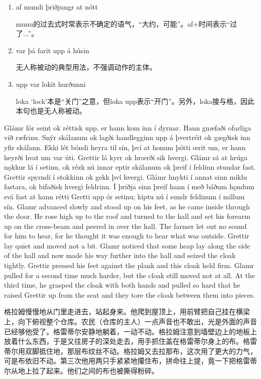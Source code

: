 \begin{grammar*}{}
    \begin{enumerate}[leftmargin=*]
        \item af mundi þriðjungr at nótt

              munu的过去式时常表示不确定的语气，“大约，可能”。af+时间表示“过了...”。

        \item var þá farit upp á húsin

              无人称被动的典型用法，不强调动作的主体。

        \item upp var lokit hurðunni

              loka `lock'本是“关门”之意，但loka upp表示“开门”。另外，loka接与格，因此本句也是无人称被动。
    \end{enumerate}
\end{grammar*}
\begin{paracol}{2}
    Glámr fór seint ok réttisk upp, er hann kom inn í dyrnar. Hann gnæfaði ofarliga við ræfrinu. Snýr skálanum ok lagði handlegginn upp á þvertréit ok gægðisk inn yfir skálann. Ekki lét bóndi heyra til sín, því at honum þótti œrit um, er hann heyrði hvat um var úti. Grettir lá kyrr ok hrœrði sik hvergi. Glámr sá at hrúga nǫkkur lá í setinu, ok rézk nú innar eptir skálanum ok þreif í feldinn stundar fast. Grettir spyrndi í stokkinn ok gekk því hvergi. Glámr hnykti í annat sinn miklu fastara, ok bifaðisk hvergi feldrinn. Í þriðja sinn þreif hann í með báðum hǫndum svá fast at hann rétti Gretti upp ór setinu; kiptu nú í sundr feldinum í millum sín.
    \switchcolumn
    Glamr advanced slowly and stood up on his feet, as he came inside through the door. He rose high up to the roof and turned to the hall and set his forearm up on the cross-beam and peered in over the hall. The farmer let out no sound for him to hear, for he thought it was enough to hear what was outside. Grettir lay quiet and moved not a bit. Glamr noticed that some heap lay along the side of the hall and now made his way further into the hall and seized the cloak tightly. Grettir pressed his feet against the plank and this cloak held firm. Glamr pulled for a second time much harder, but the cloak still moved not at all. At the third time, he grasped the cloak with both hands and pulled so hard that he raised Grettir up from the seat and they tore the cloak between them into pieces.
\end{paracol}
\begin{translation*}{}
    格拉姆慢慢地从门里走进去，站起身来。他爬到屋顶上，用前臂把自己挂在横梁上，向下俯视整个仓库。农民（仓库的主人）一点声音也不敢出，光是外面的声音已经够他受了。格雷蒂尔安静地躺着，一动不动。格拉姆注意到墙壁边上的地板上放着什么东西，于是又往房子的深处走去，用手抓住盖在格雷蒂尔身上的布。格雷蒂尔用双脚抵住地，那层布纹丝不动。格拉姆又去拉那布，这次用了更大的力气，可是布依旧不动。第三次他用两只手紧紧地攥住布，拼命往上提，竟一下把格雷蒂尔从地上拉了起来。他们之间的布也被撕得粉碎。
\end{translation*}
